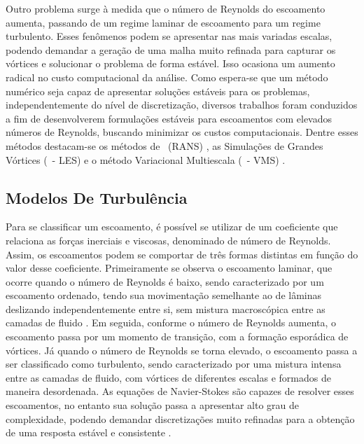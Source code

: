 Outro problema surge à medida que o número de Reynolds do escoamento aumenta, passando de um regime laminar de escoamento para um regime turbulento. Esses fenômenos podem se apresentar nas mais variadas escalas, podendo demandar a geração de uma malha muito refinada para capturar os vórtices e solucionar o problema de forma estável. Isso ocasiona um aumento radical no custo computacional da análise. Como espera-se que um método numérico seja capaz de apresentar soluções estáveis para os problemas, independentemente do nível de discretização, diversos trabalhos foram conduzidos a fim de desenvolverem formulações estáveis para escoamentos com elevados números de Reynolds, buscando minimizar os custos computacionais. Dentre esses métodos destacam-se os métodos de \RANS\ (RANS) \cite{speziale1991analytical,alfonsi2009reynolds,ling2015evaluation}, as Simulações de Grandes Vórtices (\LES\ - LES) \cite{germano1991dynamic,piomelli1999large,hughes2000large,vsekutkovski2021partitioned} e o método Variacional Multiescala (\VMS\ - VMS) \cite{hughes1995multiscale,hughes1998variational,hughes2002variational,bazilevs2010large,bazilevs2013computational}.

\subsection{Modelos De Turbulência} \label{MT}

Para se classificar um escoamento, é possível se utilizar de um coeficiente que relaciona as forças inerciais e viscosas, denominado de número de Reynolds. Assim, os escoamentos podem se comportar de três formas distintas em função do valor desse coeficiente. Primeiramente se observa o escoamento laminar, que ocorre quando o número de Reynolds é baixo, sendo caracterizado por um escoamento ordenado, tendo sua movimentação semelhante ao de lâminas deslizando independentemente entre si, sem mistura macroscópica entre as camadas de fluido \cite{popiolek2005analise,shaughnessy2005introduction}. Em seguida, conforme o número de Reynolds aumenta, o escoamento passa por um momento de transição, com a formação esporádica de vórtices. Já quando o número de Reynolds se torna elevado, o escoamento passa a ser classificado como turbulento, sendo caracterizado por uma mistura intensa entre as camadas de fluido, com vórtices de diferentes escalas e formados de maneira desordenada. As equações de Navier-Stokes são capazes de resolver esses escoamentos, no entanto sua solução passa a apresentar alto grau de complexidade, podendo demandar discretizações muito refinadas para a obtenção de uma resposta estável e consistente \cite{neto2002fundamentos}.

